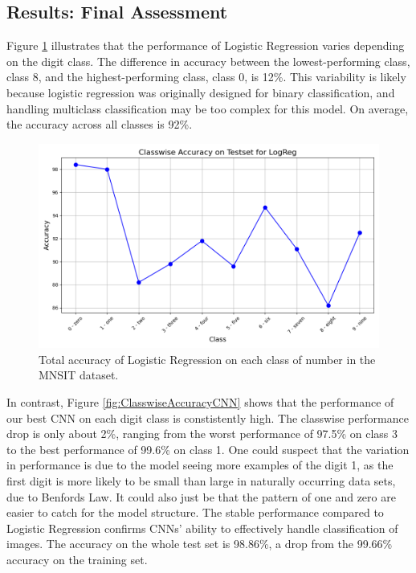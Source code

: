 \subsection{Results: Final Assessment}

Figure \ref{fig:ClasswiseAccuracyLogReg} illustrates that the performance of Logistic Regression varies depending on the digit class. The difference in accuracy between the lowest-performing class, class 8, and the highest-performing class, class 0, is 12\%. This variability is likely because logistic regression was originally designed for binary classification, and handling multiclass classification may be too complex for this model. On average, the accuracy across all classes is 92\%.

\begin{figure}[H]
    \centering
    \includegraphics[width=\textwidth]{results/evaluation/LogReg_classwise_acc.png}
    \caption{Total accuracy of Logistic Regression on each class of number in the MNSIT dataset.}
    \label{fig:ClasswiseAccuracyLogReg}
\end{figure}
In contrast, Figure \ref{fig:ClasswiseAccuracyCNN} shows that the performance of our best CNN on each digit class is constistently high. The classwise performance drop is only about 2\%, ranging from the worst performance of 97.5\% on class 3 to the best performance of 99.6\% on class 1. One could suspect that the variation in performance is due to the model seeing more examples of the digit 1, as the first digit is more likely to be small than large in naturally occurring data sets, due to Benfords Law. It could also just be that the pattern of one and zero are easier to catch for the model structure. The stable performance compared to Logistic Regression confirms CNNs' ability to effectively handle classification of images. The accuracy on the whole test set is 98.86\%, a drop from the 99.66\% accuracy on the training set.
